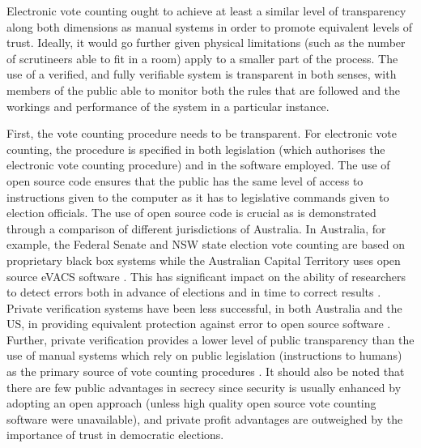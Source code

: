 Electronic vote counting ought to achieve at least a similar level
of transparency along both dimensions as manual systems in order to
promote equivalent levels of trust. Ideally, it would go further
given physical limitations (such as the number of scrutineers
able to fit in a room) apply to a smaller part of the process. The
use of a verified, and fully verifiable system is transparent in both senses, with members of
the public able to monitor both the rules that are followed
and the workings and performance of the system in a particular
instance. 

First, the vote counting procedure needs to be transparent. For
electronic vote counting, the procedure is specified in both
legislation (which authorises the electronic vote counting
procedure) and in the software employed. The use of open source code
ensures that the public has the same level of access to instructions
given to the computer as it has to legislative commands given to
election officials. The use of open source code is crucial as is
demonstrated through a comparison of different jurisdictions of
Australia. In Australia, for example, the Federal Senate and NSW
state election vote counting are based on proprietary black box
systems while the Australian Capital Territory uses open source
eVACS software
\citep{AEC:2013:LMM,Conway:2017:ANS,EA:2016:EVC}. This has
significant impact on the ability of researchers to detect errors
both in advance of elections and in time to correct results
\citep{Conway:2017:ANS}.
Private verification systems have been less successful, in both
Australia and the US, in providing equivalent protection against
error to open source software
\citep{Carrier:2012:VCT,Conway:2017:ANS}. Further, private
verification provides a lower level of public transparency than the
use of manual systems which rely on public legislation (instructions
to humans) as the primary source of vote counting procedures
\citep{Carrier:2012:VCT}. It
should also be noted that there are few public advantages in secrecy
since security is usually enhanced by adopting an open approach
(unless high quality open source vote counting software were
unavailable), and private profit advantages are outweighed by the
importance of trust in democratic elections. 

